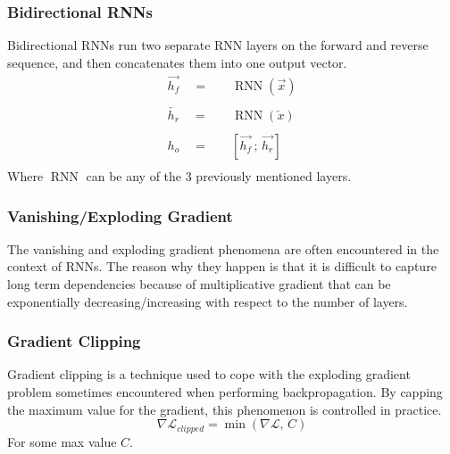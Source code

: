 \subsubsection{Bidirectional RNNs}
Bidirectional RNNs run two separate RNN layers on the forward and reverse
sequence, and then concatenates them into one output vector.
\begin{equation}
  \begin{split}
    \overrightarrow{h_f} \quad =& \quad \operatorname{RNN}\left(\overrightarrow{x}\right) \\
    \\
    \overleftarrow{h_r} \quad =& \quad \operatorname{RNN}\left(\overleftarrow{x}\right) \\
    \\
    h_o \quad =& \quad \left[\overrightarrow{h_f} \,;\, \overrightarrow{h_r} \right] \\
  \end{split}
\end{equation}
Where $\operatorname{RNN}$ can be any of the 3 previously mentioned layers.
\subsubsection{Vanishing/Exploding Gradient}
The vanishing and exploding gradient phenomena are often encountered in the
context of RNNs. The reason why they happen is that it is difficult to
capture long term dependencies because of multiplicative gradient that can
be exponentially decreasing/increasing with respect to the number of layers.
\subsubsection{Gradient Clipping}
Gradient clipping is a technique used to cope with the exploding gradient
problem sometimes encountered when performing backpropagation.
By capping the maximum value for the gradient, this phenomenon is
controlled in practice.
\begin{equation}
  \nabla \mathcal{L}_{clipped} = \min \left( \nabla \mathcal{L}, \, C  \right)
\end{equation}
For some max value $C$.
